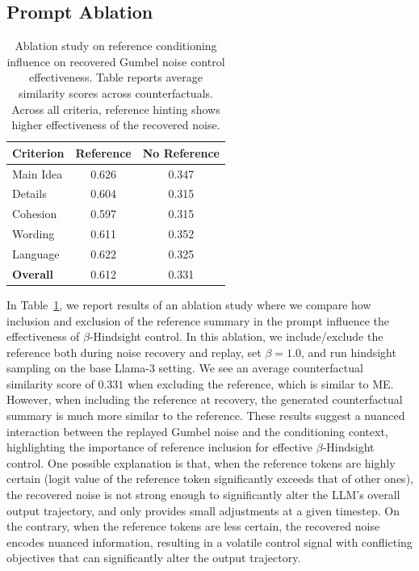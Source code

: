 \documentclass[letterpaper]{article} %
\begin{document}
\subsection{Prompt Ablation} \label{apx:prompt-ablate}

\begin{table}[t]
\centering
\small
\begin{tabular}{lcc}
\toprule
\textbf{Criterion} & \textbf{Reference} & \textbf{No Reference} \\
\midrule
Main Idea  & 0.626 & 0.347 \\
Details    & 0.604 & 0.315 \\
Cohesion   & 0.597 & 0.315 \\
Wording    & 0.611 & 0.352 \\
Language   & 0.622 & 0.325 \\
\midrule
\textbf{Overall} & 0.612 & 0.331 \\
\bottomrule
\end{tabular}
\caption{Ablation study on reference conditioning influence on recovered Gumbel noise control effectiveness. Table reports average similarity scores across counterfactuals. Across all criteria, reference hinting shows higher effectiveness of the recovered noise.}
\label{tab:foresight_ablation}
\end{table}

In Table~\ref{tab:foresight_ablation}, we report results of an ablation study where we compare how inclusion and exclusion of the reference summary in the prompt influence the effectiveness of $\beta$-Hindsight control. In this ablation, we include/exclude the reference both during noise recovery and replay, set $\beta=1.0$, and run hindsight sampling on the base Llama-3 setting. We see an average counterfactual similarity score of $0.331$ when excluding the reference, which is similar to ME. However, when including the reference at recovery, the generated counterfactual summary is much more similar to the reference. These results suggest a nuanced interaction between the replayed Gumbel noise and the conditioning context, highlighting the importance of reference inclusion for effective $\beta$-Hindsight control. One possible explanation is that, when the reference tokens are highly certain (logit value of the reference token significantly exceeds that of other ones), the recovered noise is not strong enough to significantly alter the LLM's overall output trajectory, and only provides small adjustments at a given timestep. On the contrary, when the reference tokens are less certain, the recovered noise encodes nuanced information, resulting in a volatile control signal with conflicting objectives that can significantly alter the output trajectory. 
\end{document}
